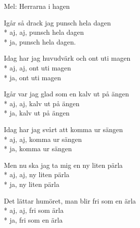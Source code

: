 \begin{SongText}[Botvisa]
    \begin{SongInfo}
        Mel: Herrarna i hagen
    \end{SongInfo}
    \begin{SongVerse}
        Igår så drack jag punsch hela dagen\\*%
        aj, aj, punsch hela dagen\\*%
        ja, punsch hela dagen.
    \end{SongVerse}
    \begin{SongVerse}
        Idag har jag huvudvärk och ont uti magen\\*%
        aj, aj, ont uti magen\\*%
        ja, ont uti magen
    \end{SongVerse}
    \begin{SongVerse}
        Igår var jag glad som en kalv ut på ängen\\*%
        aj, aj, kalv ut på ängen\\*%
        ja, kalv ut på ängen
    \end{SongVerse}
    \begin{SongVerse}
        Idag har jag svårt att komma ur sängen\\*%
        aj, aj, komma ur sängen\\*%
        ja, komma ur sängen
    \end{SongVerse}
    \begin{SongVerse}
        Men nu ska jag ta mig en ny liten pärla\\*%
        aj, aj, ny liten pärla\\*%
        ja, ny liten pärla
    \end{SongVerse}
    \begin{SongVerse}
        Det lättar humöret, man blir fri som en ärla\\*%
        aj, aj, fri som ärla\\*%
        ja, fri som en ärla
    \end{SongVerse}
\end{SongText}
